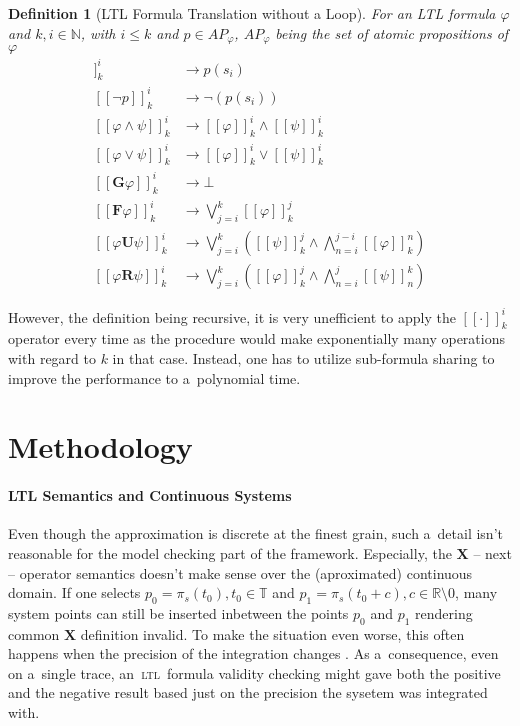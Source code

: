 \documentclass[12pt,oneside,draft]{fithesis}
\newcommand{\ltl}{\textsc{ltl}~}
\newcommand{\mReal}{\mathbb{R}}
\newcommand{\mNatural}{\mathbb{N}}
\newcommand{\mTime}{\mathbb{T}}
\newcommand{\bF}{\mathbf{F}}
\newcommand{\bG}{\mathbf{G}}
\newcommand{\bX}{\mathbf{X}}
\newcommand{\bU}{\mathbf{U}}
\newcommand{\bR}{\mathbf{R}}
\newtheorem{mydef}{Definition}
\begin{document}
\begin{mydef}[LTL Formula Translation without a Loop]
For an LTL formula $\varphi$ and $k,i\in\mNatural$, with $i\leq k$ and
$p\in {AP}_\varphi$, ${AP}_\varphi$ being the set of atomic propositions
of $\varphi$
\begin{align}
	[[p]]_k^i&\rightarrow p(s_i)\\
	[[\neg p]]_k^i&\rightarrow\neg(p(s_i))\\
	[[\varphi\wedge\psi]]_k^i&\rightarrow
		[[\varphi]]_k^i\wedge[[\psi]]_k^i\\
	[[\varphi\vee\psi]]_k^i&\rightarrow
		[[\varphi]]_k^i\vee[[\psi]]_k^i\\
	[[\bG\varphi]]_k^i&\rightarrow\bot\\
	[[\bF\varphi]]_k^i&\rightarrow\bigvee_{j=i}^k[[\varphi]]_k^j\\
	[[\varphi\bU\psi]]_k^i&\rightarrow\bigvee_{j=i}^k\left(
		[[\psi]]_k^j\wedge\bigwedge_{n=i}^{j-i}[[\varphi]]_k^n
	\right)\\
	[[\varphi\bR\psi]]_k^i&\rightarrow\bigvee_{j=i}^k\left(
		[[\varphi]]_k^j\wedge\bigwedge_{n=i}^j[[\psi]]_n^k
	\right)
\end{align} 
\end{mydef}
However, the definition being recursive, it is very unefficient to
apply the $[[\cdot]]_k^i$ operator every time as the procedure would make 
exponentially many operations with regard to $k$ in that case.
Instead, one has to utilize sub-formula sharing to improve the
performance to a~polynomial time\cite{biere}. 

\chapter{Methodology}
\subsubsection*{LTL Semantics and Continuous Systems}
Even though the approximation is discrete at the finest grain,
such a~detail isn't reasonable for the model checking part of the
framework. Especially, the $\bX$ -- next -- operator semantics
doesn't make sense over the (aproximated) continuous domain.
If one selects $p_0 = \pi_s(t_0),t_0\in\mTime$ and
$p_1 = \pi_s(t_0+c),c\in\mReal\setminus 0$, many system points can still
be inserted inbetween the points $p_0$ and $p_1$ rendering common $\bX$
definition invalid. To make the situation even worse, this often happens
when the precision of the integration changes \cite{integration}.
As a~consequence, even on a~single trace, an~\ltl formula validity
checking might gave both the positive and the negative result based just
on the precision the sysetem was integrated with. 
\end{document}
